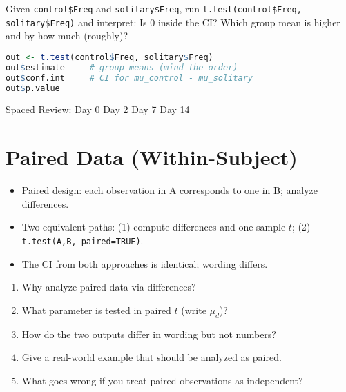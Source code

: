 \documentclass[11pt,a4paper]{article}
\def\textbf#1{#1}%
\newcommand{\reviewticks}{
  \vspace{0.4em}
  \noindent\scriptsize\textbf{Spaced Review:}
  \fbox{\phantom{D0}} Day 0\quad
  \fbox{\phantom{D2}} Day 2\quad
  \fbox{\phantom{D7}} Day 7\quad
  \fbox{\phantom{D14}} Day 14
}
\begin{document}
\begin{practicebox}
Given \texttt{control\$Freq} and \texttt{solitary\$Freq}, run \texttt{t.test(control\$Freq, solitary\$Freq)} and interpret:
Is 0 inside the CI? Which group mean is higher and by how much (roughly)?
\end{practicebox}

\begin{rbox}
\begin{lstlisting}[language=R]
out <- t.test(control$Freq, solitary$Freq)
out$estimate     # group means (mind the order)
out$conf.int     # CI for mu_control - mu_solitary
out$p.value
\end{lstlisting}
\end{rbox}

\reviewticks

\section{Paired Data (Within-Subject)}

\begin{corebox}
\begin{itemize}
  \item Paired design: each observation in A corresponds to one in B; analyze \textbf{differences}.
  \item Two equivalent paths: (1) compute differences and one-sample \(t\); (2) \texttt{t.test(A,B, paired=TRUE)}.
  \item The CI from both approaches is \textbf{identical}; wording differs.
\end{itemize}
\end{corebox}

\begin{recallbox}
\begin{enumerate}
  \item Why analyze paired data via differences?
  \item What parameter is tested in paired \(t\) (write \(\mu_d\))?
  \item How do the two outputs differ in wording but not numbers?
  \item Give a real-world example that should be analyzed as paired.
  \item What goes wrong if you treat paired observations as independent?
\end{enumerate}
\end{recallbox}
\end{document}
